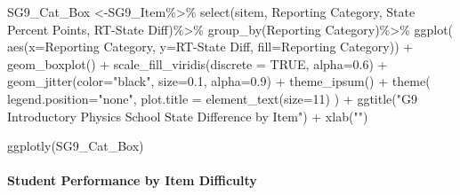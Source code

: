 \documentclass[
  letterpaper,
  DIV=11,
  numbers=noendperiod]{scrartcl}
\let\oldparagraph\paragraph
\renewcommand{\paragraph}[1]{\oldparagraph{#1}\mbox{}}
\newenvironment{Shaded}{\begin{snugshade}}{\end{snugshade}}
\newcommand{\AttributeTok}[1]{\textcolor[rgb]{0.40,0.45,0.13}{#1}}
\newcommand{\ConstantTok}[1]{\textcolor[rgb]{0.56,0.35,0.01}{#1}}
\newcommand{\DecValTok}[1]{\textcolor[rgb]{0.68,0.00,0.00}{#1}}
\newcommand{\FloatTok}[1]{\textcolor[rgb]{0.68,0.00,0.00}{#1}}
\newcommand{\FunctionTok}[1]{\textcolor[rgb]{0.28,0.35,0.67}{#1}}
\newcommand{\NormalTok}[1]{\textcolor[rgb]{0.00,0.23,0.31}{#1}}
\newcommand{\OtherTok}[1]{\textcolor[rgb]{0.00,0.23,0.31}{#1}}
\newcommand{\SpecialCharTok}[1]{\textcolor[rgb]{0.37,0.37,0.37}{#1}}
\newcommand{\StringTok}[1]{\textcolor[rgb]{0.13,0.47,0.30}{#1}}
\begin{document}
\begin{Shaded}
\begin{Highlighting}[]
\NormalTok{SG9\_Cat\_Box }\OtherTok{\textless{}{-}}\NormalTok{SG9\_Item}\SpecialCharTok{\%\textgreater{}\%}
  \FunctionTok{select}\NormalTok{(}\StringTok{\textasciigrave{}}\AttributeTok{sitem}\StringTok{\textasciigrave{}}\NormalTok{, }\StringTok{\textasciigrave{}}\AttributeTok{Reporting Category}\StringTok{\textasciigrave{}}\NormalTok{, }\StringTok{\textasciigrave{}}\AttributeTok{State Percent Points}\StringTok{\textasciigrave{}}\NormalTok{, }\StringTok{\textasciigrave{}}\AttributeTok{RT{-}State Diff}\StringTok{\textasciigrave{}}\NormalTok{)}\SpecialCharTok{\%\textgreater{}\%}
  \FunctionTok{group\_by}\NormalTok{(}\StringTok{\textasciigrave{}}\AttributeTok{Reporting Category}\StringTok{\textasciigrave{}}\NormalTok{)}\SpecialCharTok{\%\textgreater{}\%}
  \FunctionTok{ggplot}\NormalTok{( }\FunctionTok{aes}\NormalTok{(}\AttributeTok{x=}\StringTok{\textasciigrave{}}\AttributeTok{Reporting Category}\StringTok{\textasciigrave{}}\NormalTok{, }\AttributeTok{y=}\StringTok{\textasciigrave{}}\AttributeTok{RT{-}State Diff}\StringTok{\textasciigrave{}}\NormalTok{, }\AttributeTok{fill=}\StringTok{\textasciigrave{}}\AttributeTok{Reporting Category}\StringTok{\textasciigrave{}}\NormalTok{)) }\SpecialCharTok{+}
    \FunctionTok{geom\_boxplot}\NormalTok{() }\SpecialCharTok{+}
    \FunctionTok{scale\_fill\_viridis}\NormalTok{(}\AttributeTok{discrete =} \ConstantTok{TRUE}\NormalTok{, }\AttributeTok{alpha=}\FloatTok{0.6}\NormalTok{) }\SpecialCharTok{+}
    \FunctionTok{geom\_jitter}\NormalTok{(}\AttributeTok{color=}\StringTok{"black"}\NormalTok{, }\AttributeTok{size=}\FloatTok{0.1}\NormalTok{, }\AttributeTok{alpha=}\FloatTok{0.9}\NormalTok{) }\SpecialCharTok{+}
    \FunctionTok{theme\_ipsum}\NormalTok{() }\SpecialCharTok{+}
    \FunctionTok{theme}\NormalTok{(}
      \AttributeTok{legend.position=}\StringTok{"none"}\NormalTok{,}
      \AttributeTok{plot.title =} \FunctionTok{element\_text}\NormalTok{(}\AttributeTok{size=}\DecValTok{11}\NormalTok{)}
\NormalTok{    ) }\SpecialCharTok{+}
    \FunctionTok{ggtitle}\NormalTok{(}\StringTok{"G9 Introductory Physics School State Difference by Item"}\NormalTok{) }\SpecialCharTok{+}
    \FunctionTok{xlab}\NormalTok{(}\StringTok{""}\NormalTok{)}

\FunctionTok{ggplotly}\NormalTok{(SG9\_Cat\_Box)}
\end{Highlighting}
\end{Shaded}

\hypertarget{student-performance-by-item-difficulty}{%
\paragraph{Student Performance by Item
Difficulty}\label{student-performance-by-item-difficulty}}
\end{document}
